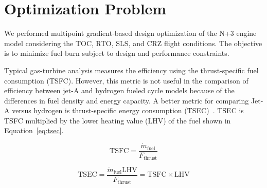 \documentclass[conf]{new-aiaa}
\begin{document}
\section{Optimization Problem}
\label{sec:optprob}

We performed multipoint gradient-based design optimization of the N+3 engine model considering the TOC, RTO, SLS, and CRZ flight conditions.
The objective is to minimize fuel burn subject to design and performance constraints.

Typical gas-turbine analysis measures the efficiency using the thrust-specific fuel consumption (TSFC).
However, this metric is not useful in the comparison of efficiency between jet-A and hydrogen fueled cycle models because of the differences in fuel density and energy capacity.
A better metric for comparing Jet-A versus hydrogen is thrust-specific energy consumption (TSEC)~\cite{Adler2023}.
TSEC is TSFC multiplied by the lower heating value (LHV) of the fuel shown in Equation~\eqref{eq:tsec}.

\begin{equation}
    \mathrm{TSFC} = \frac{\dot{m}_{\mathrm{fuel}}}{F_{\mathrm{thrust}}}
    \label{eq:tsfc}
\end{equation}

\begin{equation}
    \mathrm{TSEC} = \frac{\dot{m}_{\mathrm{fuel}} \mathrm{LHV}}{F_{\mathrm{thrust}}} = \mathrm{TSFC} \times \mathrm{LHV}
    \label{eq:tsec}
\end{equation}
\end{document}
